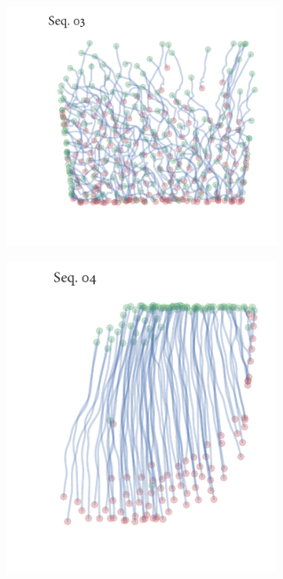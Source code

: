 \begin{figure}[h]
\begin{subfigure}[t]{0.5\textwidth}
		\includegraphics{sequence03.pdf}
	\end{subfigure}%
	\begin{subfigure}[t]{0.5\textwidth}
		\centering
		\includegraphics{sequence04.pdf}
	\end{subfigure}
	\begin{subfigure}[t]{0.5\textwidth}
		\centering

\end{subfigure}
\end{figure}
